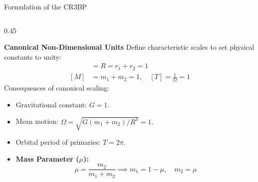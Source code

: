 \documentclass[aspectratio=169, 10pt]{beamer}
\begin{document}
\begin{frame}{Formulation of the CR3BP}
\begin{columns}[t]
        \begin{column}{0.45\textwidth}
            \begin{block}{\textbf{Canonical Non-Dimensional Units}}
                \scriptsize
                Define characteristic scales to set physical constants to unity:
                \begin{align*}
                    [L] &= R = r_1 + r_2 = 1 \\
                    [M] &= m_1 + m_2 = 1, \quad [T] = \frac{1}{\Omega} = 1
                \end{align*}
                Consequences of canonical scaling:
                \begin{itemize}\setlength{\itemsep}{2pt}
                    \item Gravitational constant: $G = 1$.
                    \item Mean motion: $\Omega = \sqrt{G(m_1 + m_2)/R^3} = 1$.
                    \item Orbital period of primaries: $T = 2\pi$.
                    \item \textbf{Mass Parameter ($\mu$):}
                    \begin{equation*}
                        \mu = \frac{m_2}{m_1 + m_2} \implies m_1 = 1 - \mu, \quad m_2 = \mu
                    \end{equation*}
                \end{itemize}
            \end{block}
        \end{column}
    \end{columns}
\end{frame}
\end{document}
